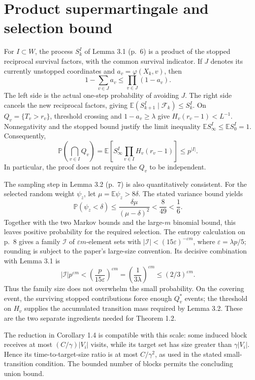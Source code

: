 \documentclass[10pt]{article}
\begin{document}
\section*{Product supermartingale and selection bound}
For \(I\subset W\), the process \(S_k^I\) of Lemma 3.1 (p. 6) is a product of the stopped reciprocal survival factors, with the common survival indicator. If \(J\) denotes its currently unstopped coordinates and \(a_v=\varphi(X_k,v)\), then \[1-\sum_{v\in J}a_v\leq\prod_{v\in J}(1-a_v).\] The left side is the actual one-step probability of avoiding \(J\). The right side cancels the new reciprocal factors, giving \(\mathbb E(S_{k+1}^I\mid\mathcal F_k)\leq S_k^I\). On \(Q_v=\{T_v>r_v\}\), threshold crossing and \(1-a_v\geq\lambda\) give \(H_v(r_v-1)<L^{-1}\). Nonnegativity and the stopped bound justify the limit inequality \(\mathbb ES_\infty^I\leq \mathbb ES_0^I=1\). Consequently, \[\mathbb P\left(\bigcap_{v\in I}Q_v\right)
 =\mathbb E\left[S_\infty^I\prod_{v\in I}H_v(r_v-1)\right]
 \leq p^{|I|}.\] In particular, the proof does not require the \(Q_v\) to be independent.\par
The sampling step in Lemma 3.2 (p. 7) is also quantitatively consistent. For the selected random weight \(\psi_z\), let \(\mu=\mathbb E\psi_z>8\delta\). The stated variance bound yields \[\mathbb P(\psi_z<\delta)
 \leq \frac{\delta\mu}{(\mu-\delta)^2}
 <\frac{8}{49}<\frac16.\] Together with the two Markov bounds and the large-\(m\) binomial bound, this leaves positive probability for the required selection. The entropy calculation on p. 8 gives a family \(\mathcal I\) of \(\varepsilon m\)-element sets with \(|\mathcal I|<(15\varepsilon)^{-\varepsilon m}\), where \(\varepsilon=\lambda p/5\); rounding is subject to the paper’s large-size convention. Its decisive combination with Lemma 3.1 is \[|\mathcal I|p^{\varepsilon m}
 <\left(\frac{p}{15\varepsilon}\right)^{\varepsilon m}
 =\left(\frac{1}{3\lambda}\right)^{\varepsilon m}
 \leq (2/3)^{\varepsilon m}.\] Thus the family size does not overwhelm the small probability. On the covering event, the surviving stopped contributions force enough \(Q_v^*\) events; the threshold on \(H_v\) supplies the accumulated transition mass required by Lemma 3.2. These are the two separate ingredients needed for Theorem 1.2.\par
The reduction in Corollary 1.4 is compatible with this scale: some induced block receives at most \((C/\gamma)|V_i|\) visits, while its target set has size greater than \(\gamma|V_i|\). Hence its time-to-target-size ratio is at most \(C/\gamma^2\), as used in the stated small-transition condition. The bounded number of blocks permits the concluding union bound.\par
\end{document}
